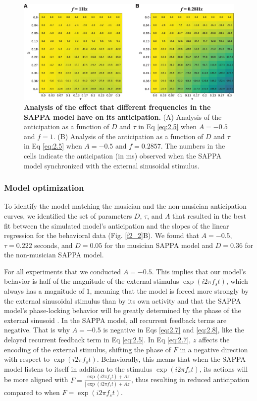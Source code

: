\documentclass{report}
\begin{document}
\begin{figure}
    \centering
    \includegraphics[width=1.0\textwidth]{figures/fig2_7.png}
    \caption[Analysis of the effect that different frequencies in the SAPPA model have on its anticipation]{\textbf{Analysis of the effect that different frequencies in the SAPPA model have on its anticipation.} (A) Analysis of the anticipation as a function of $D$ and $\tau$ in Eq \eqref{eq:2.5} when $A = -0.5$ and $f = 1$. (B) Analysis of the anticipation as a function of $D$ and $\tau$ in Eq \eqref{eq:2.5} when $A = -0.5$ and $f = 0.2857$. The numbers in the cells indicate the anticipation (in ms) observed when the SAPPA model synchronized with the external sinusoidal stimulus.}
    \label{f2_7}
\end{figure}

\subsubsection{Model optimization}

To identify the model matching the musician and the non-musician anticipation curves, we identified the set of parameters $D$, $\tau$, and $A$ that resulted in the best fit between the simulated model's anticipation and the slopes of the linear regression for the behavioral data (Fig.{} \ref{f2_2}B). We found that $A = -0.5$, $\tau = 0.222$ seconds, and $D = 0.05$ for the musician SAPPA model and $D = 0.36$ for the non-musician SAPPA model.

For all experiments that we conducted $A = -0.5$. This implies that our model's behavior is half of the magnitude of the external stimulus $\exp(i2\pi f_s t)$, which always has a magnitude of $1$, meaning that the model is forced more strongly by the external sinusoidal stimulus than by its own activity and that the SAPPA model's phase-locking behavior will be greatly determined by the phase of the external sinusoid \cite{kim2015signal}. In the SAPPA model, all recurrent feedback terms are negative. That is why $A = -0.5$ is negative in Eqs \eqref{eq:2.7} and \eqref{eq:2.8}, like the delayed recurrent feedback term in Eq \eqref{eq:2.5}. In Eq \eqref{eq:2.7}, $z$ affects the encoding of the external stimulus, shifting the phase of $F$ in a negative direction with respect to $\exp(i2\pi f_s t)$. Behaviorally, this means that when the SAPPA model listens to itself in addition to the stimulus $\exp(i2\pi f_s t)$, its actions will be more aligned with $F=\frac{\exp(i2\pi f_s t)+Az}{|\exp(i2\pi f_s t)+Az|}$, thus resulting in reduced anticipation compared to when $F = \exp(i2\pi f_s t)$.
\end{document}
